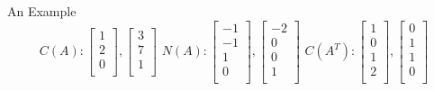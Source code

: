 \documentclass{beamer}
\begin{document}
\begin{frame}{An Example}
\begin{equation*}
    C\left( A \right) :\left[ \begin{array}{c}
        1\\
        2\\
        0\\
    \end{array} \right] ,\left[ \begin{array}{c}
        3\\
        7\\
        1\\
    \end{array} \right] \,\, N\left( A \right) :\left[ \begin{array}{c}
        -1\\
        -1\\
        1\\
        0\\
    \end{array} \right] ,\left[ \begin{array}{c}
        -2\\
        0\\
        0\\
        1\\
    \end{array} \right] \,\,C\left( A^T \right) :\left[ \begin{array}{c}
        1\\
        0\\
        1\\
        2\\
    \end{array} \right] ,\left[ \begin{array}{c}
        0\\
        1\\
        1\\
        0\\
    \end{array} \right]
\end{equation*}
\end{frame}
\end{document}
